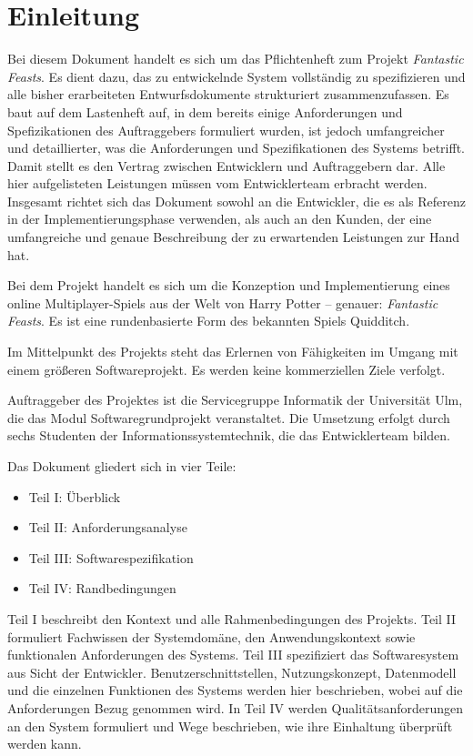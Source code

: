 \section{Einleitung}
Bei diesem Dokument handelt es sich um das Pflichtenheft zum Projekt \textit{Fantastic Feasts}. Es dient dazu, das zu entwickelnde System vollständig zu spezifizieren und alle bisher erarbeiteten Entwurfsdokumente strukturiert zusammenzufassen. Es baut auf dem Lastenheft auf, in dem bereits einige Anforderungen und Spefizikationen des Auftraggebers formuliert wurden, ist jedoch umfangreicher und detaillierter, was die Anforderungen und Spezifikationen des Systems betrifft. Damit stellt es den Vertrag zwischen Entwicklern und Auftraggebern dar. Alle hier aufgelisteten Leistungen müssen vom Entwicklerteam erbracht werden. Insgesamt richtet sich das Dokument sowohl an die Entwickler, die es als Referenz in der Implementierungsphase verwenden, als auch an den Kunden, der eine umfangreiche und genaue Beschreibung der zu erwartenden Leistungen zur Hand hat.

Bei dem Projekt handelt es sich um die Konzeption und Implementierung eines online Multiplayer-Spiels aus der Welt von Harry Potter – genauer: \textit{Fantastic Feasts}. Es ist eine rundenbasierte Form des bekannten Spiels Quidditch.

Im Mittelpunkt des Projekts steht das Erlernen von Fähigkeiten im Umgang mit einem größeren Softwareprojekt. Es werden keine kommerziellen Ziele verfolgt.

Auftraggeber des Projektes ist die Servicegruppe Informatik der Universität Ulm, die das Modul Softwaregrundprojekt veranstaltet. Die Umsetzung erfolgt durch sechs Studenten der Informationssystemtechnik, die das Entwicklerteam bilden.

Das Dokument gliedert sich in vier Teile:

\begin{itemize}
\item Teil I: Überblick
\item Teil II: Anforderungsanalyse
\item Teil III: Softwarespezifikation
\item Teil IV: Randbedingungen
\end{itemize}

Teil I beschreibt den Kontext und alle Rahmenbedingungen des Projekts. Teil II formuliert Fachwissen der Systemdomäne, den Anwendungskontext sowie funktionalen Anforderungen des Systems. Teil III spezifiziert das Softwaresystem aus Sicht der Entwickler. Benutzerschnittstellen, Nutzungskonzept, Datenmodell und die einzelnen Funktionen des Systems werden hier beschrieben, wobei auf die Anforderungen Bezug genommen wird. In Teil IV werden Qualitätsanforderungen an den System formuliert und Wege beschrieben, wie ihre Einhaltung überprüft werden kann. 


